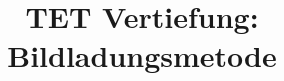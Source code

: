 
\usepackage{pdfpages}

\title[TET Vertiefung: Bildladungsmetode]{TET Vertiefung: Bildladungsmetode}
 
 
 
 

